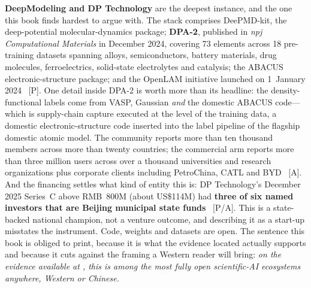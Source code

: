 \textbf{DeepModeling and DP Technology} are the deepest instance, and the one this book finds hardest to argue with. The stack comprises DeePMD-kit, the deep-potential molecular-dynamics package; \textbf{DPA-2}, published in \emph{npj Computational Materials} in December 2024, covering 73 elements across 18 pre-training datasets spanning alloys, semiconductors, battery materials, drug molecules, ferroelectrics, solid-state electrolytes and catalysis; the ABACUS electronic-structure package; and the OpenLAM initiative launched on 1~January 2024~\cite{deepmodeling} [P]. One detail inside DPA-2 is worth more than its headline: the density-functional labels come from VASP, Gaussian \emph{and} the domestic ABACUS code---which is supply-chain capture executed at the level of the training data, a domestic electronic-structure code inserted into the label pipeline of the flagship domestic atomic model. The community reports more than ten thousand members across more than twenty countries; the commercial arm reports more than three million users across over a thousand universities and research organizations plus corporate clients including PetroChina, CATL and BYD~\cite{deepmodeling,dp-tech} [A]. And the financing settles what kind of entity this is: DP Technology's December 2025 Series~C above RMB~800M (about US\$114M) had \textbf{three of six named investors that are Beijing municipal state funds}~\cite{deepmodeling} [P/A]. This is a state-backed national champion, not a venture outcome, and describing it as a start-up misstates the instrument. Code, weights and datasets are open. The sentence this book is obliged to print, because it is what the evidence located actually supports and because it cuts against the framing a Western reader will bring: \emph{on the evidence available at \datafreeze, this is among the most fully open scientific-AI ecosystems anywhere, Western or Chinese.}

